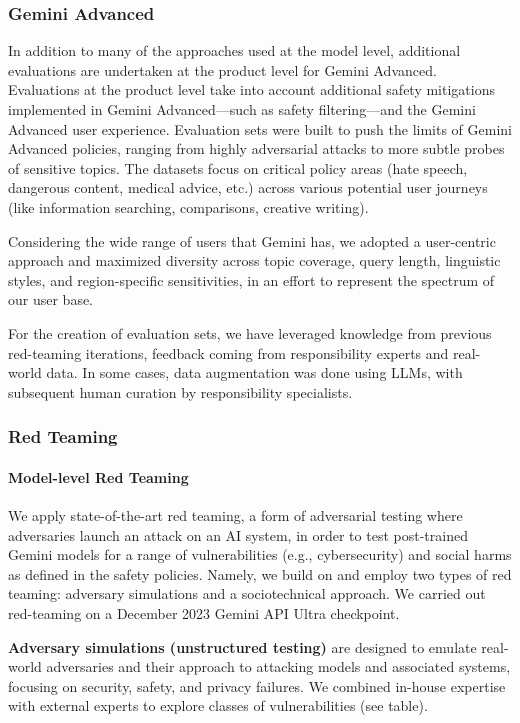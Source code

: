 \subsubsection{Gemini Advanced }

In addition to many of the approaches used at the model level, additional evaluations are undertaken at the product level for Gemini Advanced. Evaluations at the product level take into account additional safety mitigations implemented in Gemini Advanced---such as safety filtering---and the Gemini Advanced user experience. 
Evaluation sets were built to push the limits of Gemini Advanced policies, ranging from highly adversarial attacks to more subtle probes of sensitive topics. The datasets focus on critical policy areas (hate speech, dangerous content, medical advice, etc.) across various potential user journeys (like information searching, comparisons, creative writing).

Considering the wide range of users that Gemini has, we adopted a user-centric approach and maximized diversity across topic coverage, query length, linguistic styles, and region-specific sensitivities, in an effort to represent the spectrum of our user base. 

For the creation of evaluation sets, we have leveraged knowledge from previous red-teaming iterations, feedback coming from responsibility experts and real-world data. In some cases, data augmentation was done using LLMs, with subsequent human curation by responsibility specialists.

\subsubsection{Red Teaming}

\paragraph{Model-level Red Teaming} 

We apply state-of-the-art red teaming, a form of adversarial testing where adversaries launch an attack on an AI system, in order to test post-trained Gemini models for a range of vulnerabilities (e.g., cybersecurity) and social harms as defined in the safety policies. Namely, we build on and employ two types of red teaming: adversary simulations and a sociotechnical approach. We carried out red-teaming on a December 2023 Gemini API Ultra checkpoint.  

\textbf{Adversary simulations (unstructured testing)} are designed to emulate real-world adversaries and their approach to attacking models and associated systems, focusing on security, safety, and privacy failures. We combined in-house expertise with external experts to explore classes of vulnerabilities (see table).  

